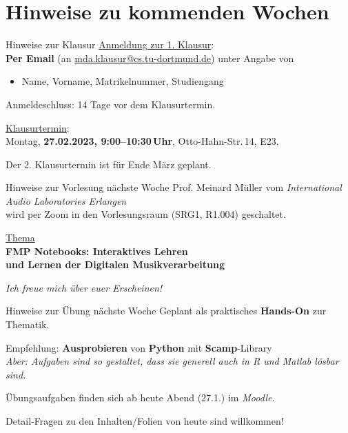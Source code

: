 \section{Hinweise zu kommenden Wochen}

\begin{frame}{Hinweise zur Klausur}
	\underline{Anmeldung zur 1. Klausur}:\\\smallskip
	\textbf{Per Email} (an \url{mda.klausur@cs.tu-dortmund.de}) unter Angabe von\\
	
	\begin{itemize}
		\item Name, Vorname, Matrikelnummer, Studiengang\\
	\end{itemize}
	
	Anmeldeschluss: 14 Tage vor dem Klausurtermin.\\
	\bigskip
	
	\underline{Klausurtermin}:\\\smallskip
	Montag, \textbf{27.02.2023, 9:00--10:30\,Uhr}, Otto-Hahn-Str.\,14, E23.\\
	\medskip
	
	Der 2. Klausurtermin ist für Ende März geplant.\\
\end{frame}

\begin{frame}{Hinweise zur Vorlesung nächste Woche}
	Prof. Meinard Müller vom \emph{International Audio Laboratories Erlangen}\\
	\hfill wird per Zoom in den Vorlesungsraum (SRG1, R1.004) geschaltet.\\
	\bigskip
	
	\centering
	\underline{Thema}\\\smallskip
	\textbf{FMP Notebooks: Interaktives Lehren\\
		und
	Lernen der Digitalen Musikverarbeitung}
	
	\bigskip\bigskip
	\emph{Ich freue mich über euer Erscheinen!} 
\end{frame}

\begin{frame}{Hinweise zur Übung nächste Woche}
Geplant als praktisches \textbf{Hands-On} zur Thematik.\\
\medskip

Empfehlung: \textbf{Ausprobieren} von \textbf{Python} mit \textbf{Scamp}-Library\\

{\small\itshape Aber: Aufgaben sind so gestaltet, dass sie generell auch in R und Matlab lösbar sind.}\\
\medskip

Übungsaufgaben finden sich ab heute Abend (27.1.) im \emph{Moodle}.
\bigskip

Detail-Fragen zu den Inhalten/Folien von heute sind willkommen!
\end{frame}
